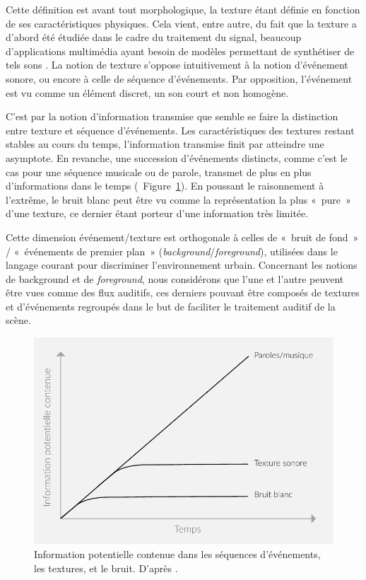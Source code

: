 Cette définition est avant tout morphologique, la texture étant définie en fonction de ses caractéristiques physiques. Cela vient, entre autre, du fait que la texture a d'abord été étudiée dans le cadre du traitement du signal, beaucoup d'applications multimédia ayant besoin de modèles permettant de synthétiser de tels sons \citep{schwarz2011state}. La notion de texture s'oppose intuitivement à la notion d'événement sonore, ou encore à celle de séquence d'événements. Par opposition, l'événement est vu comme un élément discret, un son court et non homogène.

C'est par la notion d'information transmise que semble se faire la distinction entre texture et séquence d'événements. Les caractéristiques des textures restant stables au cours du temps, l'information transmise finit par atteindre une asymptote. En revanche, une succession d'événements distincts, comme c'est le cas pour une séquence musicale ou de parole, transmet de plus en plus d'informations dans le temps (\cf~Figure~\ref{fig:texture}). En poussant le raisonnement à l’extrême, le bruit blanc peut être vu comme la représentation la plus «~pure~» d'une texture, ce dernier étant porteur d'une information très limitée.

Cette dimension événement/texture est orthogonale à celles de «~bruit de fond~» / «~événements de premier plan~» (\emph{background}/\emph{foreground}), utilisées dans le langage courant pour discriminer l’environnement urbain. Concernant les notions de background et de \emph{foreground}, nous considérons que l'une et l'autre peuvent être vues comme des flux auditifs, ces derniers pouvant être composés de textures et d’événements regroupés dans le but de faciliter le traitement auditif de la scène.

\begin{figure}[t]
        \myfloatalign
        \includegraphics[width=.8\linewidth]{gfx/ch_3/texture}
        \caption[Information potentielle contenue dans les séquences d'événements, les textures, et le bruit.]{Information potentielle contenue dans les séquences d'événements, les textures, et le bruit. D'après \citep{saint1995classification}.}\label{fig:texture}
\end{figure}

